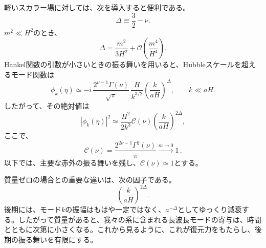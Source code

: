 \documentclass[a4paper,11pt,oneside]{article}
\theoremstyle{definition}
\numberwithin{equation}{section}
\begin{document}
軽いスカラー場に対しては、次を導入すると便利である。
\begin{equation}
\Delta
\equiv
\frac{3}{2}
-
\nu.
\end{equation}
\(m^{2}\ll H^{2}\)のとき、
\begin{equation}
\Delta
=
\frac{m^{2}}{3H^{2}}
+
\mathcal{O}\left(
\frac{m^{4}}{H^{4}}
\right).
\label{lightmassDelta}
\end{equation}
Hankel関数の引数が小さいときの振る舞いを用いると、Hubbleスケールを超えるモード関数は
\begin{equation}
\phi_{k}(\eta)
\simeq
-i\,
\frac{2^{\nu-1}\Gamma(\nu)}{\sqrt{\pi}}\,
\frac{H}{k^{3/2}}
\left(
\frac{k}{aH}
\right)^{\Delta},
\qquad
k\ll aH.
\end{equation}
したがって、その絶対値は
\begin{equation}
\left|
\phi_{k}(\eta)
\right|^{2}
\simeq
\frac{H^{2}}{2k^{3}}
\mathcal{C}(\nu)
\left(
\frac{k}{aH}
\right)^{2\Delta},
\label{massivesuperhorizonmode}
\end{equation}
ここで、
\begin{equation}
\mathcal{C}(\nu)
=
\frac{2^{2\nu-1}\Gamma^{2}(\nu)}{\pi}\overset{m\to0}{\longrightarrow} 1\,.
\end{equation}
以下では、主要な赤外の振る舞いを残し、\(\mathcal{C}(\nu)\simeq1\)とする。



質量ゼロの場合との重要な違いは、次の因子である。
\begin{equation}
\left(
\frac{k}{aH}
\right)^{2\Delta}.
\end{equation}
後期には、モード$ k$の振幅はもはや一定ではなく、$ a^{-\Delta}$としてゆっくり減衰する。したがって質量があると、我々の系に含まれる長波長モードの寄与は、時間とともに次第に小さくなる。これから見るように、これが復元力をもたらし、後期の振る舞いを有限にする。
\end{document}
